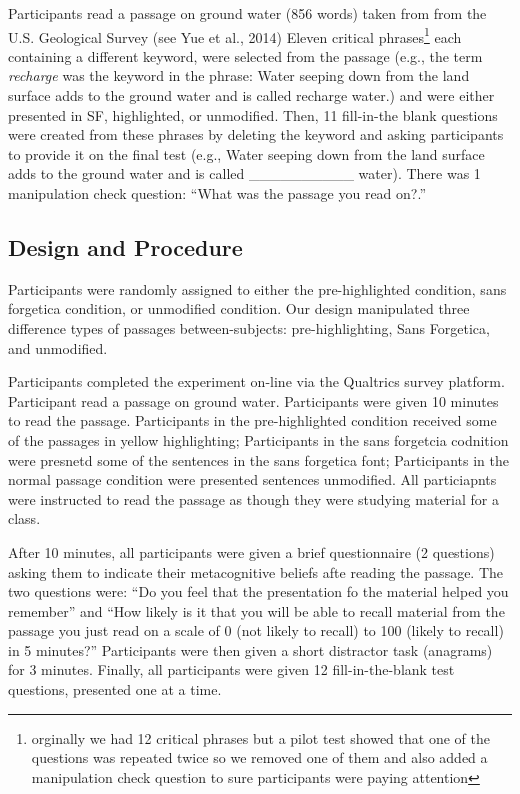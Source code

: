 \documentclass[english,doc]{apa6}
\begin{document}
Participants read a passage on ground water (856 words) taken from from the U.S. Geological Survey (see Yue et al., 2014) Eleven critical phrases\footnote{orginally we had 12 critical phrases but a pilot test showed that one of the questions was repeated twice so we removed one of them and also added a manipulation check question to sure participants were paying attention} each containing a different keyword, were selected from the passage (e.g., the term \emph{recharge} was the keyword in the phrase: Water seeping down from the land surface adds to the ground water and is called recharge water.) and were either presented in SF, highlighted, or unmodified. Then, 11 fill-in-the blank questions were created from these phrases by deleting the keyword and asking participants to provide it on the final test (e.g., Water seeping down from the land surface adds to the ground water and is called \_\_\_\_\_\_\_\_\_\_ water). There was 1 manipulation check question: \enquote{What was the passage you read on?.}

\hypertarget{design-and-procedure-1}{%
\subsection{Design and Procedure}\label{design-and-procedure-1}}

Participants were randomly assigned to either the pre-highlighted condition, sans forgetica condition, or unmodified condition. Our design manipulated three difference types of passages between-subjects: pre-highlighting, Sans Forgetica, and unmodified.

Participants completed the experiment on-line via the Qualtrics survey platform. Participant read a passage on ground water. Participants were given 10 minutes to read the passage. Participants in the pre-highlighted condition received some of the passages in yellow highlighting; Participants in the sans forgetcia codnition were presnetd some of the sentences in the sans forgetica font; Participants in the normal passage condition were presented sentences unmodified. All particiapnts were instructed to read the passage as though they were studying material for a class.

After 10 minutes, all participants were given a brief questionnaire (2 questions) asking them to indicate their metacognitive beliefs afte reading the passage. The two questions were: \enquote{Do you feel that the presentation fo the material helped you remember} and \enquote{How likely is it that you will be able to recall material from the passage you just read on a scale of 0 (not likely to recall) to 100 (likely to recall) in 5 minutes?} Participants were then given a short distractor task (anagrams) for 3 minutes. Finally, all participants were given 12 fill-in-the-blank test questions, presented one at a time.
\end{document}
